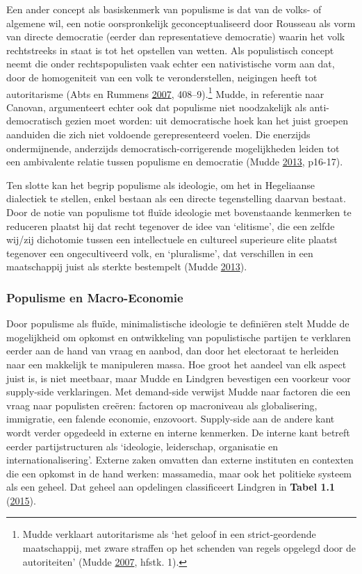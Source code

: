\documentclass[10.5pt,dutch,]{article}
\begin{document}
Een ander concept als basiskenmerk van populisme is dat van de volks- of
algemene wil, een notie oorspronkelijk geconceptualiseerd door Rousseau
als vorm van directe democratie (eerder dan representatieve democratie)
waarin het volk rechtstreeks in staat is tot het opstellen van wetten.
Als populistisch concept neemt die onder rechtspopulisten vaak echter
een nativistische vorm aan dat, door de homogeniteit van een volk te
veronderstellen, neigingen heeft tot autoritarisme (Abts en Rummens
\protect\hyperlink{ref-abtsux5fpopulismux5f2007}{2007},
408--9).\footnote{Mudde verklaart autoritarisme als `het geloof in een
  strict-geordende maatschappij, met zware straffen op het schenden van
  regels opgelegd door de autoriteiten' (Mudde
  \protect\hyperlink{ref-muddeux5fpopulistux5f2007}{2007}, hfstk. 1).}
Mudde, in referentie naar Canovan, argumenteert echter ook dat populisme
niet noodzakelijk als anti-democratisch gezien moet worden: uit
democratische hoek kan het juist groepen aanduiden die zich niet
voldoende gerepresenteerd voelen. Die enerzijds ondermijnende,
anderzijds democratisch-corrigerende mogelijkheden leiden tot een
ambivalente relatie tussen populisme en democratie (Mudde
\protect\hyperlink{ref-muddeux5foxfordux5f2013}{2013}, p16-17).

Ten slotte kan het begrip populisme als ideologie, om het in Hegeliaanse
dialectiek te stellen, enkel bestaan als een directe tegenstelling
daarvan bestaat. Door de notie van populisme tot fluïde ideologie met
bovenstaande kenmerken te reduceren plaatst hij dat recht tegenover de idee
van `elitisme', die een zelfde wij/zij dichotomie tussen een
intellectuele en cultureel superieure elite plaatst tegenover een
ongecultiveerd volk, en `pluralisme', dat verschillen in een maatschappij
juist als sterkte bestempelt (Mudde
\protect\hyperlink{ref-muddeux5foxfordux5f2013}{2013}).

\subsubsection{Populisme en
Macro-Economie}\label{populisme-en-macro-economie}

Door populisme als fluïde, minimalistische ideologie te definiëren stelt
Mudde de mogelijkheid om opkomst en ontwikkeling van populistische
partijen te verklaren eerder aan de hand van vraag en aanbod, dan door
het electoraat te herleiden naar een makkelijk te manipuleren massa. Hoe
groot het aandeel van elk aspect juist is, is niet meetbaar, maar Mudde
en Lindgren bevestigen een voorkeur voor supply-side verklaringen. Met
demand-side verwijst Mudde naar factoren die een vraag naar populisten
creëren: factoren op macroniveau als globalisering, immigratie, een
falende economie, enzovoort. Supply-side aan de andere kant wordt verder
opgedeeld in externe en interne kenmerken. De interne kant betreft
eerder partijstructuren als `ideologie, leiderschap, organisatie en
internationalisering'. Externe zaken omvatten dan externe instituten en
contexten die een opkomst in de hand werken: massamedia, maar ook het
politieke systeem als een geheel. Dat geheel aan opdelingen
classificeert Lindgren in \textbf{Tabel 1.1}
(\protect\hyperlink{ref-lindgrenux5fdevelopingux5f2015}{2015}).
\end{document}

